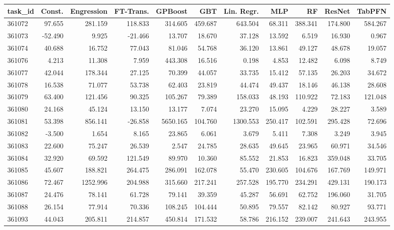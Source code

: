 \begin{tabular}{lrrrrrrrrrr}
\toprule
task\_id & Const. & Engression & FT-Trans. & GPBoost & GBT & Lin. Regr. & MLP & RF & ResNet & TabPFN \\
\midrule
361072 & 97.655 & 281.159 & 118.833 & 314.605 & 459.687 & 643.504 & 68.311 & 388.341 & 174.800 & 584.267 \\
361073 & -52.490 & 9.925 & -21.466 & 13.707 & 18.670 & 37.128 & 13.592 & 6.519 & 16.930 & 0.967 \\
361074 & 40.688 & 16.752 & 77.043 & 81.046 & 54.768 & 36.120 & 13.861 & 49.127 & 48.678 & 19.057 \\
361076 & 4.213 & 11.308 & 7.959 & 443.308 & 16.516 & 0.198 & 4.853 & 12.482 & 6.098 & 8.749 \\
361077 & 42.044 & 178.344 & 27.125 & 70.399 & 44.057 & 33.735 & 15.412 & 57.135 & 26.203 & 34.672 \\
361078 & 16.538 & 71.077 & 53.738 & 62.403 & 23.819 & 44.474 & 49.437 & 18.146 & 46.138 & 28.608 \\
361079 & 63.400 & 121.456 & 90.325 & 105.267 & 79.389 & 158.033 & 48.193 & 110.922 & 72.183 & 121.048 \\
361080 & 24.168 & 45.124 & 13.150 & 13.177 & 7.074 & 23.270 & 15.095 & 4.229 & 28.227 & 3.589 \\
361081 & 53.398 & 856.141 & -26.858 & 5650.165 & 104.760 & 1300.553 & 250.417 & 102.591 & 295.428 & 72.696 \\
361082 & -3.500 & 1.654 & 8.165 & 23.865 & 6.061 & 3.679 & 5.411 & 7.308 & 3.249 & 3.945 \\
361083 & 22.600 & 75.247 & 26.539 & 2.547 & 24.785 & 28.635 & 49.645 & 23.965 & 60.971 & 34.546 \\
361084 & 32.920 & 69.592 & 121.549 & 89.970 & 10.360 & 85.552 & 21.853 & 16.823 & 359.048 & 33.705 \\
361085 & 45.607 & 188.821 & 264.475 & 286.091 & 162.078 & 55.470 & 230.605 & 104.676 & 167.769 & 149.971 \\
361086 & 72.467 & 1252.996 & 204.988 & 315.660 & 217.241 & 257.528 & 195.770 & 234.291 & 429.131 & 190.173 \\
361087 & 24.476 & 78.141 & 61.728 & 79.141 & 39.359 & 45.287 & 56.691 & 62.752 & 196.060 & 31.705 \\
361088 & 26.154 & 77.914 & 70.336 & 108.245 & 104.444 & 50.895 & 79.557 & 82.142 & 80.927 & 93.771 \\
361093 & 44.043 & 205.811 & 214.857 & 450.814 & 171.532 & 58.786 & 216.152 & 239.007 & 241.643 & 243.955 \\

\end{tabular}
